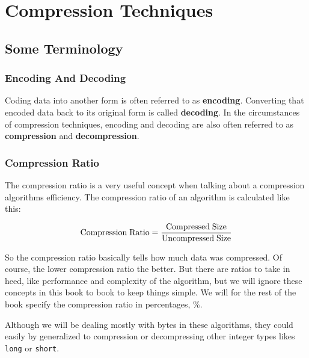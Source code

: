 \begin{comment}
  
\end{comment}
\chapter{Compression Techniques}
\label{cha:compress-techn}

\begin{refsection}

\section{Some Terminology}
\label{sec:some-terminology}

\subsection{Encoding And Decoding}
\label{sec:encoding-decoding}

Coding data into another form is often referred to as
\textbf{encoding}. Converting that encoded data back
to its original form is called
\textbf{decoding}.  In the circumstances of compression techniques, encoding and
decoding are also often referred to as
\textbf{compression} and
\textbf{decompression}.

\subsection{Compression Ratio}
\label{sec:compression-ratio}

The compression ratio is a very useful concept when talking about a
compression algorithms efficiency. The compression ratio of an
algorithm is calculated like this:

\begin{equation}
  \label{eq:compress-ratio}
  {\rm Compression\;Ratio} = \frac{\rm Compressed\;Size}{\rm Uncompressed\;Size}
\end{equation}

So the compression ratio basically tells how much data was
compressed. Of course, the lower compression ratio the better. But
there are ratios to take in heed, like performance and complexity of
the algorithm, but we will ignore these concepts in this book to book
to keep things simple. We will for the rest of the book specify the
compression ratio in percentages, $\%$\cite{Salomon:2004:DCC}.

Although we will be dealing mostly with bytes in these algorithms, they could
easily by generalized to compression or decompressing other integer
types likes \texttt{long} or \texttt{short}.

\FloatBarrier

\printbibliography[heading=subbibliography]

\end{refsection}
